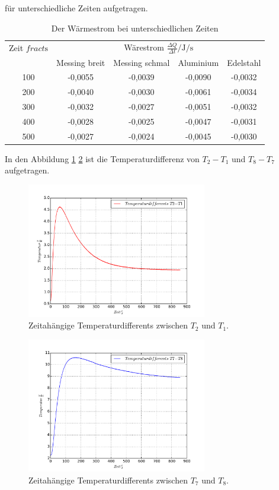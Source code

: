 für unterschiedliche Zeiten aufgetragen.
\begin{table}
  \centering
  \caption{Der Wärmestrom bei unterschiedlichen Zeiten}
  \label{tab:dQdt}
  \begin{tabular}{c c c c c}
    \toprule
    Zeit $frac{t}{\si{\second}}$ & \multicolumn{4}{c}{Wärestrom $\frac{\Delta Q}{\Delta t}/\si{\joule\per\second}$ }\\
     $ $& Messing breit & Messing schmal & Aluminium & Edelstahl \\
    \midrule
100 & -0,0055 & -0,0039 &-0,0090 &-0,0032 \\
200 & -0,0040 & -0,0030 &-0,0061 &-0,0034 \\
300 & -0,0032 & -0,0027 &-0,0051 &-0,0032 \\
400 & -0,0028 & -0,0025 &-0,0047 &-0,0031 \\
500 & -0,0027 & -0,0024 &-0,0045 &-0,0030 \\
    \bottomrule
  \end{tabular}
\end{table}
\FloatBarrier
In den Abbildung \ref{abb:T2-T1} \ref{abb:T7-T8} ist die
Temperaturdifferenz von $T_2-T_1$ und $T_8-T_7$ aufgetragen.
\begin{figure}
  \centering
  \includegraphics[width=0.7\textwidth]{plotT2-T1.pdf}
  \caption{Zeitahängige Temperaturdifferents zwischen $T_2$ und $T_1$.}
  \label{abb:T2-T1}
\end{figure}
\begin{figure}
  \centering
  \includegraphics[width=0.7\textwidth]{plotT7-T8.pdf}
  \caption{Zeitahängige Temperaturdifferents zwischen $T_7$ und $T_8$.}
  \label{abb:T7-T8}
\end{figure}
